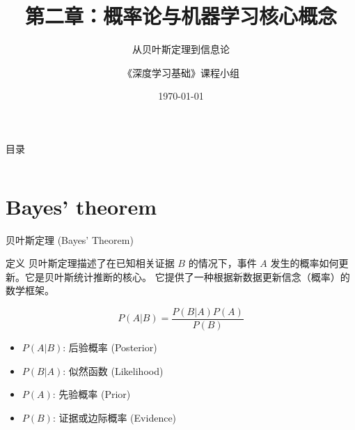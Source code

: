 \documentclass[12pt, t, aspectratio=169]{beamer}
\title{第二章：概率论与机器学习核心概念}
\subtitle{从贝叶斯定理到信息论}
\author{《深度学习基础》课程小组}
\date{\today}
\begin{document}
\begin{frame}
    \titlepage
\end{frame}

\begin{frame}{目录}
    \begin{columns}
        \tableofcontents[sections={1-10}]
        \tableofcontents[sections={11-20}]
    \end{columns}
\end{frame}



\section{Bayes' theorem}
\begin{frame}{贝叶斯定理 (Bayes' Theorem)}
    \begin{block}{定义}
        贝叶斯定理描述了在已知相关证据 $B$ 的情况下，事件 $A$ 发生的概率如何更新。它是贝叶斯统计推断的核心。
        它提供了一种根据新数据更新信念（概率）的数学框架。
    \end{block}
    
    \begin{equation*}
        P(A|B) = \frac{P(B|A)P(A)}{P(B)}
    \end{equation*}
    
    \begin{itemize}
        \item $P(A|B)$: 后验概率 (Posterior)
        \item $P(B|A)$: 似然函数 (Likelihood)
        \item $P(A)$: 先验概率 (Prior)
        \item $P(B)$: 证据或边际概率 (Evidence)
    \end{itemize}
    
\end{frame}
\end{document}
